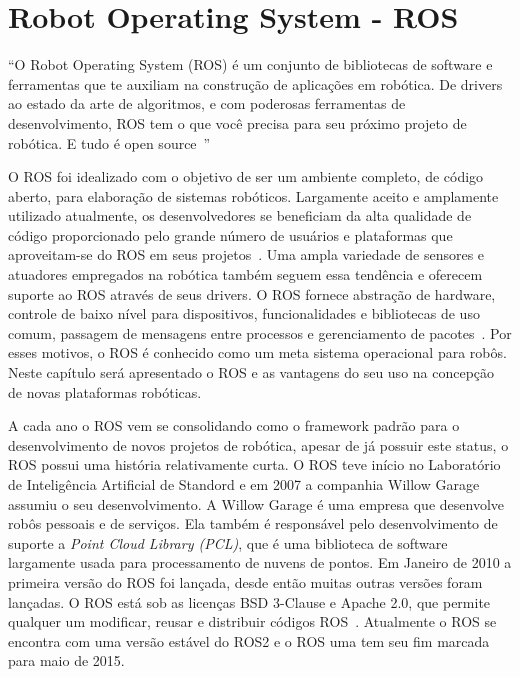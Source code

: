 \chapter{Robot Operating System - ROS}\label{cap:ros}

\begin{citacao}
``O Robot Operating System (ROS) é um conjunto de bibliotecas de software e ferramentas que te auxiliam na construção de aplicações em robótica. De drivers ao estado da arte de algoritmos, e com poderosas ferramentas de desenvolvimento, ROS tem o que você precisa para seu próximo projeto de robótica. E tudo é open source~\cite{Ros}''    
\end{citacao}

O ROS foi idealizado com o objetivo de ser um ambiente completo, de código aberto, para elaboração de sistemas robóticos. Largamente aceito e amplamente utilizado atualmente, os desenvolvedores se beneficiam da alta qualidade de código proporcionado pelo grande número de usuários e plataformas que aproveitam-se do ROS em seus projetos~\cite{RosIntro}. Uma ampla variedade de sensores e atuadores empregados na robótica também seguem essa tendência e oferecem suporte ao ROS através de seus drivers. O ROS fornece abstração de hardware, controle de baixo nível para dispositivos, funcionalidades e bibliotecas de uso comum, passagem de mensagens entre processos e gerenciamento de pacotes~\cite{rosEfetiveProgram}. Por esses motivos, o ROS é conhecido como um meta sistema operacional para robôs. Neste capítulo será apresentado o ROS e as vantagens do seu uso na concepção de novas plataformas robóticas.

A cada ano o ROS vem se consolidando como o framework padrão para o desenvolvimento de novos projetos de robótica, apesar de já possuir este status, o ROS possui uma história relativamente curta. O ROS teve início no Laboratório de Inteligência Artificial de Standord e em 2007 a companhia Willow Garage assumiu o seu desenvolvimento. A Willow Garage é uma empresa que desenvolve robôs pessoais e de serviços. Ela também é responsável pelo desenvolvimento de suporte a \textit{Point Cloud Library (PCL)}, que é uma biblioteca de software largamente usada para processamento de nuvens de pontos. Em Janeiro de 2010 a primeira versão do ROS foi lançada, desde então muitas outras versões foram lançadas. O ROS está sob as licenças BSD 3-Clause e Apache 2.0, que permite qualquer um modificar, reusar e distribuir códigos ROS~\cite{rosPYO}. Atualmente o ROS se encontra com uma versão estável do ROS2 e o ROS uma tem seu fim marcada para maio de 2015.




